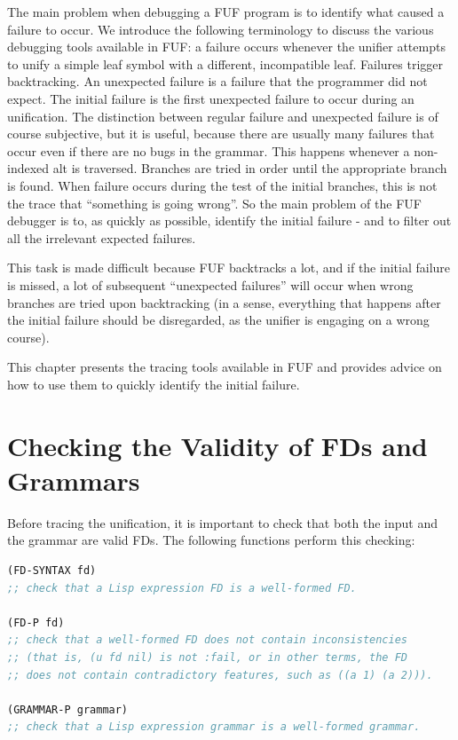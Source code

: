 \documentclass[10pt,a4paper]{report}
\begin{document}
The main problem when debugging a FUF program is to identify what caused a
failure to occur.  We introduce the following terminology to discuss the
various debugging tools available in FUF: a failure occurs whenever the
unifier attempts to unify a simple leaf symbol with a different,
incompatible leaf.  Failures trigger backtracking.  An unexpected failure
is a failure that the programmer did not expect.  The initial failure is
the first unexpected failure to occur during an unification.  The
distinction between regular failure and unexpected failure is of course
subjective, but it is useful, because there are usually many failures that
occur even if there are no bugs in the grammar.  This happens whenever a
non-indexed alt is traversed.  Branches are tried in order until the
appropriate branch is found.  When failure occurs during the test of the
initial branches, this is not the trace that ``something is going wrong''.
So the main problem of the FUF debugger is to, as quickly as possible,
identify the initial failure - and to filter out all the irrelevant
expected failures.
\label{initial-failure}

This task is made difficult because FUF backtracks a lot, and if the
initial failure is missed, a lot of subsequent ``unexpected failures'' will
occur when wrong branches are tried upon backtracking (in a sense,
everything that happens after the initial failure should be disregarded, as
the unifier is engaging on a wrong course).

This chapter presents the tracing tools available in FUF and provides
advice on how to use them to quickly identify the initial failure.


\section{Checking the Validity of FDs and Grammars}

Before tracing the unification, it is important to check that both the
input and the grammar are valid FDs.  The following functions perform this
checking: 

\begin{lstlisting}[language=Lisp]
(FD-SYNTAX fd)
;; check that a Lisp expression FD is a well-formed FD.

(FD-P fd)
;; check that a well-formed FD does not contain inconsistencies
;; (that is, (u fd nil) is not :fail, or in other terms, the FD
;; does not contain contradictory features, such as ((a 1) (a 2))).

(GRAMMAR-P grammar)
;; check that a Lisp expression grammar is a well-formed grammar.
\end{lstlisting}
\end{document}
